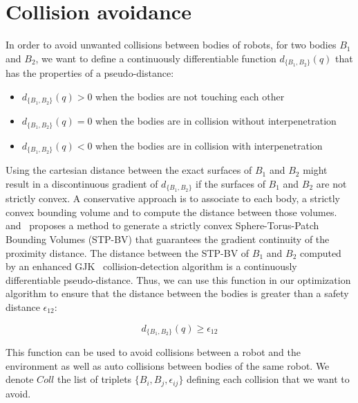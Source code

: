 \section{Collision avoidance}
\label{sec:collision_avoidance}


In order to avoid unwanted collisions between bodies of robots, for two bodies $B_1$ and $B_2$, we want to define a continuously differentiable function $d_{\{B_1, B_2\}}(q)$ that has the properties of a pseudo-distance:
\begin{itemize}
  \item $d_{\{B_1, B_2\}}(q) > 0$ when the bodies are not touching each other
  \item $d_{\{B_1, B_2\}}(q) = 0$ when the bodies are in collision without interpenetration
  \item $d_{\{B_1, B_2\}}(q) < 0$ when the bodies are in collision with interpenetration
\end{itemize}

Using the cartesian distance between the exact surfaces of $B_1$ and $B_2$ might result in a discontinuous gradient of $d_{\{B_1, B_2\}}$ if the surfaces of $B_1$ and $B_2$ are not strictly convex.
A conservative approach is to associate to each body, a strictly convex bounding volume and to compute the distance between those volumes.
\cite{escande:humanoids:2007} and~\cite{escande:itro:2014} proposes a method to generate a strictly convex Sphere-Torus-Patch Bounding Volumes (STP-BV) that guarantees the gradient continuity of the proximity distance.
The distance between the STP-BV of $B_1$ and $B_2$ computed by an enhanced GJK~\cite{gilbert-1988a} collision-detection algorithm is a continuously differentiable pseudo-distance.
Thus, we can use this function in our optimization algorithm to ensure that the distance between the bodies is greater than a safety distance $\epsilon_{12}$:

\begin{equation}
  \boxed{d_{\{B_1, B_2\}}(q) \geq \epsilon_{12}}
\end{equation}

This function can be used to avoid collisions between a robot and the environment as well as auto collisions between bodies of the same robot.
We denote $Coll$ the list of triplets $\{B_i, B_j, \epsilon_{ij}\}$ defining each collision that we want to avoid.

